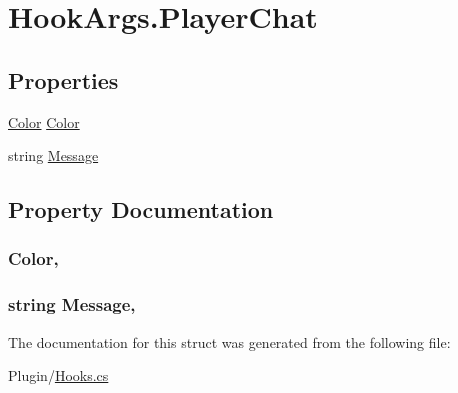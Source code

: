 \hypertarget{structOTA_1_1Plugin_1_1HookArgs_1_1PlayerChat}{}\section{Hook\+Args.\+Player\+Chat}
\label{structOTA_1_1Plugin_1_1HookArgs_1_1PlayerChat}
\subsection*{Properties}
\begin{DoxyCompactItemize}
\item 
\hyperlink{structMicrosoft_1_1Xna_1_1Framework_1_1Color}{Color} \hyperlink{structOTA_1_1Plugin_1_1HookArgs_1_1PlayerChat_a56bde2e57a33eeee68015a7be51fc825}{Color}
\item 
string \hyperlink{structOTA_1_1Plugin_1_1HookArgs_1_1PlayerChat_a40e8debace0cc6f4f7baa0fdd309c103}{Message}
\end{DoxyCompactItemize}


\subsection{Property Documentation}
\hypertarget{structOTA_1_1Plugin_1_1HookArgs_1_1PlayerChat_a56bde2e57a33eeee68015a7be51fc825}{}
\subsubsection[{Color}]{ {\bf Color}\hspace{0.3cm}{\ttfamily [get]}, {\ttfamily [set]}}\label{structOTA_1_1Plugin_1_1HookArgs_1_1PlayerChat_a56bde2e57a33eeee68015a7be51fc825}
\hypertarget{structOTA_1_1Plugin_1_1HookArgs_1_1PlayerChat_a40e8debace0cc6f4f7baa0fdd309c103}{}
\subsubsection[{Message}]{\setlength{\rightskip}{0pt plus 5cm}string Message\hspace{0.3cm}{\ttfamily [get]}, {\ttfamily [set]}}\label{structOTA_1_1Plugin_1_1HookArgs_1_1PlayerChat_a40e8debace0cc6f4f7baa0fdd309c103}


The documentation for this struct was generated from the following file\+:\begin{DoxyCompactItemize}
\item 
Plugin/\hyperlink{Hooks_8cs}{Hooks.\+cs}\end{DoxyCompactItemize}

